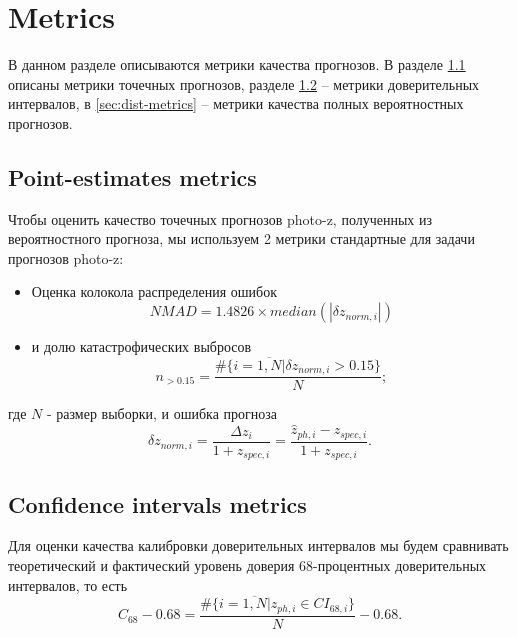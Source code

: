 \documentclass[fleqn,usenatbib]{mnras}
\begin{document}
\section{Metrics}

В данном разделе описываются метрики качества прогнозов. В разделе \ref{sec:point-metrics} описаны метрики точечных прогнозов, разделе \ref{sec:ci-metrics} -- метрики доверительных интервалов, в \ref{sec:dist-metrics} -- метрики качества полных вероятностных прогнозов.

\subsection{Point-estimates metrics}\label{sec:point-metrics}

Чтобы оценить качество точечных прогнозов photo-z, полученных из вероятностного прогноза, мы используем 2 метрики стандартные для задачи прогнозов photo-z:
\begin{itemize}
    \item Оценка колокола распределения ошибок \begin{equation}\label{eq:nmad}
        NMAD = 1.4826 \times median(|\delta z_{norm,i}|)
    \end{equation}
    \item и долю катастрофических выбросов \begin{equation}\label{eq:n015}
        n_{>0.15} = \frac{\#\{i = \overline{1, N} | \delta z_{norm, i} > 0.15\}}{N};
    \end{equation}
\end{itemize}
где \(N\) - размер выборки, и ошибка прогноза \begin{equation}\label{eq:dznorm}
    \delta z_{norm,i} = \frac{\Delta z_i}{1+z_{spec,i}} = \frac{\hat{z}_{ph,i} - z_{spec,i}}{1+z_{spec,i}}.
\end{equation}

\subsection{Confidence intervals metrics}\label{sec:ci-metrics}

Для оценки качества калибровки доверительных интервалов мы будем сравнивать теоретический и фактический уровень доверия 68-процентных доверительных интервалов, то есть \begin{equation}\label{eq:c68}
    C_{68} - 0.68 = \frac{\#\{i = \overline{1, N} | z_{ph,i} \in CI_{68, i}\}}{N} - 0.68.
\end{equation}
\end{document}

